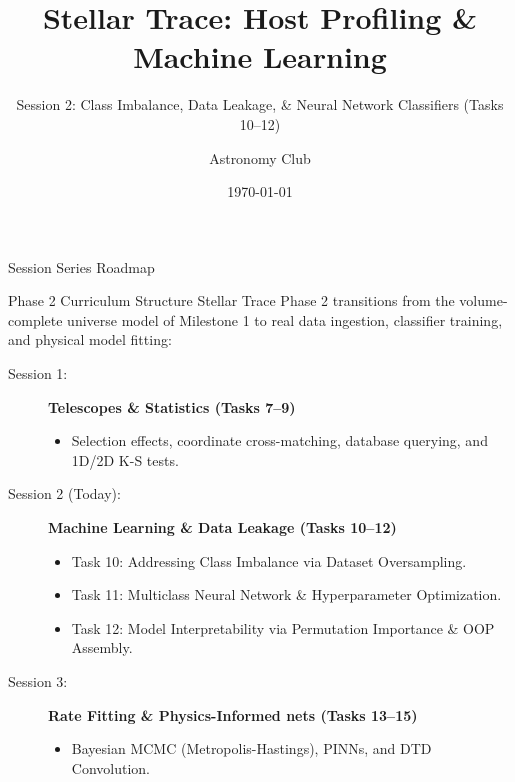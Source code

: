 \documentclass[9pt]{beamer}
\title{Stellar Trace: Host Profiling \& Machine Learning}
\subtitle{Session 2: Class Imbalance, Data Leakage, \& Neural Network Classifiers (Tasks 10--12)}
\author{Astronomy Club}
\date{\today}
\begin{document}
\maketitle

\begin{frame}{Session Series Roadmap}
  \begin{block}{Phase 2 Curriculum Structure}
    Stellar Trace Phase 2 transitions from the volume-complete universe model of Milestone 1 to real data ingestion, classifier training, and physical model fitting:
  \end{block}
  \begin{description}
    \item[Session 1:] \textbf{Telescopes \& Statistics (Tasks 7--9)}
      \begin{itemize}
        \item Selection effects, coordinate cross-matching, database querying, and 1D/2D K-S tests.
      \end{itemize}
    \item[Session 2 (Today):] \textbf{Machine Learning \& Data Leakage (Tasks 10--12)}
      \begin{itemize}
        \item Task 10: Addressing Class Imbalance via Dataset Oversampling.
        \item Task 11: Multiclass Neural Network \& Hyperparameter Optimization.
        \item Task 12: Model Interpretability via Permutation Importance \& OOP Assembly.
      \end{itemize}
    \item[Session 3:] \textbf{Rate Fitting \& Physics-Informed nets (Tasks 13--15)}
      \begin{itemize}
        \item Bayesian MCMC (Metropolis-Hastings), PINNs, and DTD Convolution.
      \end{itemize}
  \end{description}
\end{frame}
\end{document}
